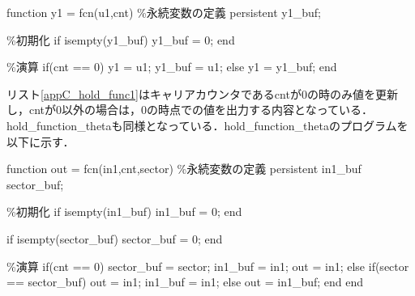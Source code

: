 
\begin{mylisting}[language=c,caption=hold\_function2,label=appC_hold_func1]
function y1  = fcn(u1,cnt)
\%永続変数の定義
persistent y1\_buf;

\%初期化
if isempty(y1\_buf)
    y1\_buf = 0;
end

\%演算
if(cnt == 0)
    y1 = u1;
    y1\_buf = u1;
else
    y1 = y1\_buf;
end

\end{mylisting}

リスト\ref{appC_hold_func1}はキャリアカウンタであるcntが0の時のみ値を更新し，cntが0以外の場合は，0の時点での値を出力する内容となっている．hold\_function\_thetaも同様となっている．hold\_function\_thetaのプログラムを以下に示す．


\begin{mylisting}[language=c,caption=hold\_function\_theta,label=appC_hold_func2]
function out  = fcn(in1,cnt,sector)
\%永続変数の定義
persistent in1\_buf sector\_buf;

\%初期化
if isempty(in1\_buf)
    in1\_buf = 0;
end

if isempty(sector\_buf)
    sector\_buf = 0;
end

\%演算
if(cnt == 0)
    sector\_buf = sector;
    in1\_buf = in1;
    out = in1;
else
    if(sector == sector\_buf)
        out = in1;
        in1\_buf = in1;
    else
        out = in1\_buf;
    end
end

\end{mylisting}
